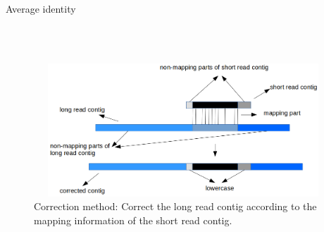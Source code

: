 \documentclass{llncs}
\begin{document}
\begin{algorithm}
\caption{Average identity} %
\label{alg:avgident}
\begin{algorithmic}
  \\
  \\
  \ENDWHILE
\end{algorithmic}
\end{algorithm}




\begin{figure}[htbp]
\centerline{\includegraphics[width=12cm, height=5cm]{BACAlgorithm1.png}}
\caption{Correction method: Correct the long read contig according to the mapping information of the short read contig.}
\label{fig:correction}
\end{figure}
\end{document}

